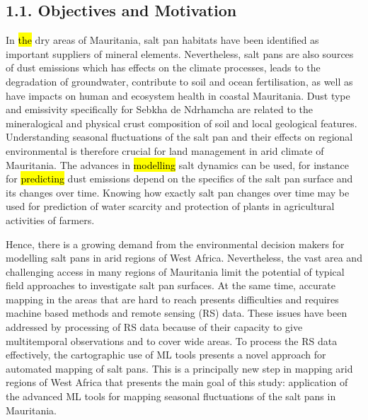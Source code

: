 \documentclass[12pt,a4paper,oneside]{article}
\def \newpar{\vspace{6pt}}
\begin{document}
\subsection*{1.1. Objectives and Motivation}

\newpar In \hl{the} dry areas of Mauritania, salt pan habitats have been identified as important suppliers of mineral elements. Nevertheless, salt pans are also sources of dust emissions which has effects on the climate processes, leads to the degradation of groundwater, contribute to soil and ocean fertilisation, as well as have impacts on human and ecosystem health in coastal Mauritania. Dust type and emissivity specifically for Sebkha de Ndrhamcha are related to the mineralogical and physical crust composition of soil and local geological features. Understanding seasonal fluctuations of the salt pan and their effects on regional environmental is therefore crucial for land management in arid climate of Mauritania. The advances in \hl{modelling} salt dynamics can be used, for instance for \hl{predicting} dust emissions depend on the specifics of the salt pan surface and its changes over time. Knowing how exactly salt pan changes over time may be used for prediction of water scarcity and protection of plants in agricultural activities of farmers. 

\newpar Hence, there is a growing demand from the environmental decision makers for modelling salt pans in arid regions of West Africa. Nevertheless, the vast area and challenging access in many regions of Mauritania limit the potential of typical field approaches to investigate salt pan surfaces. At the same time, accurate mapping in the areas that are hard to reach presents difficulties and requires machine based methods and remote sensing (RS) data. These issues have been addressed by processing of RS data because of their capacity to give multitemporal observations and to cover wide areas. To process the RS data effectively, the cartographic use of ML tools presents a novel approach for automated mapping of salt pans.  This is a principally new step in mapping arid regions of West Africa that presents the main goal of this study: application of the advanced ML tools for mapping seasonal fluctuations of the salt pans in Mauritania.  
\end{document}
